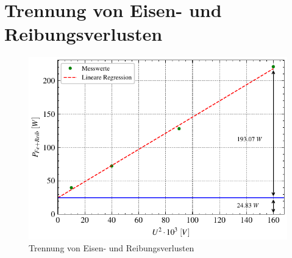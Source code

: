 \documentclass[conference]{IEEEtran}
\begin{document}
\section{Trennung von Eisen- und Reibungsverlusten}



\begin{figure}[h]
    \centering
    \includegraphics[width=\columnwidth]{./figures/trennung_eisen_reib.pdf}
    \caption{Trennung von Eisen- und Reibungsverlusten}
    \label{fig:trennung_von_eisen_reib}
\end{figure}
\end{document}
